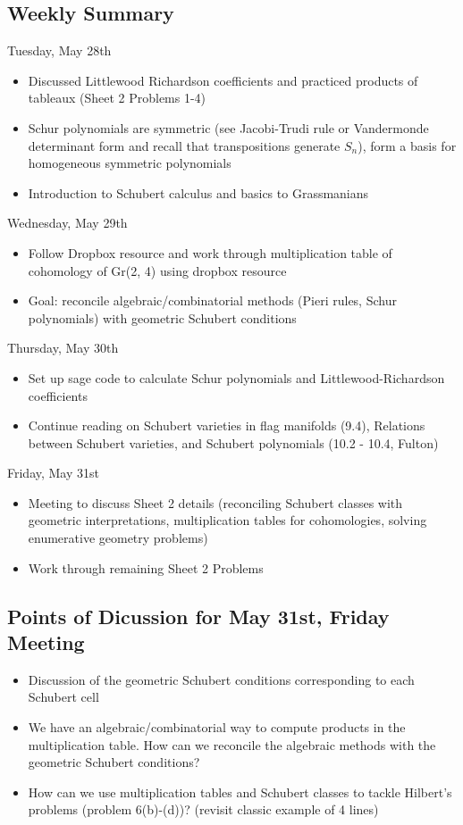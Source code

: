
\subsection{Weekly Summary}

Tuesday, May 28th
\begin{itemize}
    \item Discussed Littlewood Richardson coefficients and practiced products of tableaux (Sheet 2 Problems 1-4)
    \item Schur polynomials are symmetric (see Jacobi-Trudi rule or Vandermonde determinant form and recall that transpositions generate $S_n$), form a basis for homogeneous symmetric polynomials
    \item Introduction to Schubert calculus and basics to Grassmanians
\end{itemize}

Wednesday, May 29th
\begin{itemize}
    \item Follow Dropbox resource and work through multiplication table of cohomology of Gr(2, 4) using dropbox resource
    \item Goal: reconcile algebraic/combinatorial methods (Pieri rules, Schur polynomials) with geometric Schubert conditions

\end{itemize}

Thursday, May 30th
\begin{itemize}
    \item Set up sage code to calculate Schur polynomials and Littlewood-Richardson coefficients
    \item Continue reading on Schubert varieties in flag manifolds (9.4), Relations between Schubert varieties, and Schubert polynomials (10.2 - 10.4, Fulton)
\end{itemize}

Friday, May 31st
\begin{itemize}
    \item Meeting to discuss Sheet 2 details (reconciling Schubert classes with geometric interpretations, multiplication tables for cohomologies, solving enumerative geometry problems)
    \item Work through remaining Sheet 2 Problems
\end{itemize}

\subsection{Points of Dicussion for May 31st, Friday Meeting}
\begin{itemize}
    \item Discussion of the geometric Schubert conditions corresponding to each Schubert cell
    
    \item We have an algebraic/combinatorial way to compute products in the multiplication table. How can we reconcile the algebraic methods with the geometric Schubert conditions?

    \item How can we use multiplication tables and Schubert classes to tackle Hilbert's problems (problem 6(b)-(d))? (revisit classic example of 4 lines)
\end{itemize}